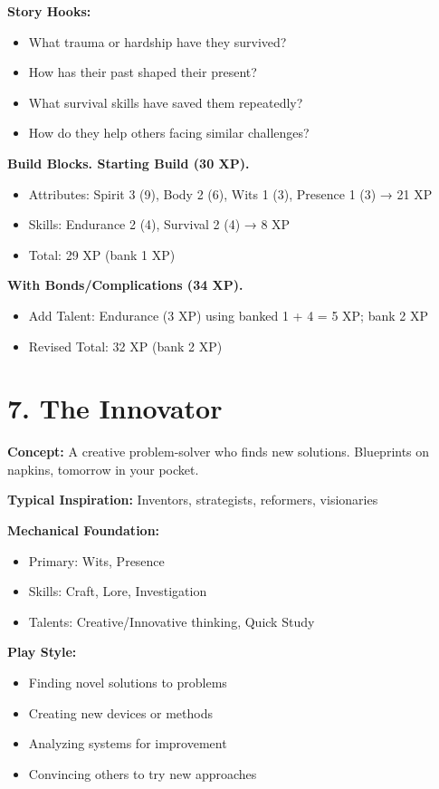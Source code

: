 \documentclass[11pt,twoside,openany]{book}
\begin{document}
\textbf{Story Hooks:}
\begin{itemize}
\item What trauma or hardship have they survived?
\item How has their past shaped their present?
\item What survival skills have saved them repeatedly?
\item How do they help others facing similar challenges?
\end{itemize}

\textbf{Build Blocks. Starting Build (30 XP).}
\begin{itemize}
\item Attributes: Spirit 3 (9), Body 2 (6), Wits 1 (3), Presence 1 (3) → 21 XP
\item Skills: Endurance 2 (4), Survival 2 (4) → 8 XP
\item Total: 29 XP (bank 1 XP)
\end{itemize}

\textbf{With Bonds/Complications (34 XP).}
\begin{itemize}
\item Add Talent: Endurance (3 XP) using banked 1 + 4 = 5 XP; bank 2 XP
\item Revised Total: 32 XP (bank 2 XP)
\end{itemize}

\section*{7. The Innovator} 

\textbf{Concept:} A creative problem-solver who finds new solutions. Blueprints on napkins, tomorrow in your pocket.

\textbf{Typical Inspiration:} Inventors, strategists, reformers, visionaries

\textbf{Mechanical Foundation:}
\begin{itemize}
\item Primary: Wits, Presence
\item Skills: Craft, Lore, Investigation
\item Talents: Creative/Innovative thinking, Quick Study
\end{itemize}

\textbf{Play Style:}
\begin{itemize}
\item Finding novel solutions to problems
\item Creating new devices or methods
\item Analyzing systems for improvement
\item Convincing others to try new approaches
\end{itemize}
\end{document}
